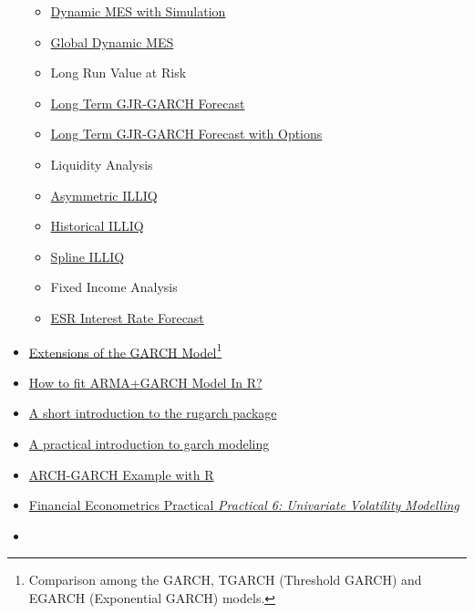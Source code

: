 \documentclass[]{tufte-book}
\begin{document}
\begin{itemize}
\begin{itemize}
  \item
    \href{https://vlab.stern.nyu.edu/doc/22?topic=mdls}{{Dynamic MES
    with Simulation}}
  \item
    \href{https://vlab.stern.nyu.edu/doc/17?topic=mdls}{{Global Dynamic
    MES}}
  \item
    Long Run Value at Risk
  \item
    \href{https://vlab.stern.nyu.edu/doc/18?topic=mdls}{{Long Term
    GJR-GARCH Forecast}}
  \item
    \href{https://vlab.stern.nyu.edu/doc/19?topic=mdls}{{Long Term
    GJR-GARCH Forecast with Options}}
  \item
    Liquidity Analysis
  \item
    \href{https://vlab.stern.nyu.edu/doc/28?topic=mdls}{{Asymmetric
    ILLIQ}}
  \item
    \href{https://vlab.stern.nyu.edu/doc/29?topic=mdls}{{Historical
    ILLIQ}}
  \item
    \href{https://vlab.stern.nyu.edu/doc/27?topic=mdls}{{Spline ILLIQ}}
  \item
    Fixed Income Analysis
  \item
    \href{https://vlab.stern.nyu.edu/doc/39?topic=mdls}{{ESR Interest
    Rate Forecast}}
  \end{itemize}
\item
  \href{http://sfb649.wiwi.hu-berlin.de/fedc_homepage/xplore/tutorials/sfehtmlnode67.html}{{Extensions
  of the GARCH Model}}\footnote{Comparison among the GARCH, TGARCH
    (Threshold GARCH) and EGARCH (Exponential GARCH) models.}
\item
  \href{https://quant.stackexchange.com/questions/4948/how-to-fit-armagarch-model-in-r?answertab=votes\#tab-top}{{How
  to fit ARMA+GARCH Model In R?}}
\item
  \href{http://unstarched.net/r-examples/rugarch/a-short-introduction-to-the-rugarch-package/}{{A
  short introduction to the rugarch package}}
\item
  \href{https://www.r-bloggers.com/a-practical-introduction-to-garch-modeling/}{{A
  practical introduction to garch modeling}}
\item
  \href{http://yunus.hacettepe.edu.tr/~iozkan/eco665/archgarch.html}{{ARCH-GARCH
  Example with R}}
\item
  \href{http://curiousquant.com/ClassNotes/FinMetrics/Practicals/Practical_6/Practical_6.html}{{Financial
  Econometrics Practical \emph{Practical 6: Univariate Volatility
  Modelling}}}
\item

\end{itemize}
\end{document}
